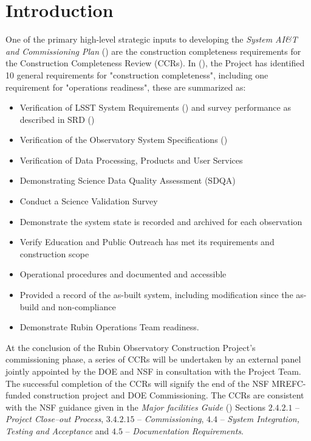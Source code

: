 
\section {Introduction}

One of the primary high-level strategic inputs to developing the {\it System AI\&T and Commissioning Plan} () are the construction completeness requirements for the Construction Completeness Review (CCRs).  In (), the Project has identified 10 general requirements for "construction completeness", including one requirement for "operations readiness", these are summarized as:

\begin{itemize}
        \item Verification of LSST System Requirements () and survey performance as described in SRD ()
        \item Verification of the Observatory System Specifications ()
        \item Verification of Data Processing, Products and User Services
        \item Demonstrating Science Data Quality Assessment (SDQA)
        \item Conduct a Science Validation Survey
        \item Demonstrate the system state is recorded and archived for each observation
        \item Verify Education and Public Outreach has met its requirements and construction scope
        \item Operational procedures and documented and accessible
        \item Provided a record of the as-built system, including modification since the as-build and non-compliance
        \item Demonstrate Rubin Operations Team readiness.
\end{itemize}

At the conclusion of the Rubin Observatory Construction Project's commissioning phase, a series of CCRs will be undertaken by an external panel jointly appointed by the DOE and NSF in consultation with the Project Team. The successful completion of the CCRs will signify the end of the NSF MREFC-funded construction project and DOE Commissioning. The CCRs are consistent with the NSF guidance given in the {\it Major facilities Guide} () Sections $2.4.2.1$ -- {\it Project Close--out Process}, $3.4.2.15$ -- {\it Commissioning}, $4.4$ -- {\it System Integration, Testing and Acceptance} and $4.5$ -- {\it Documentation Requirements}.

